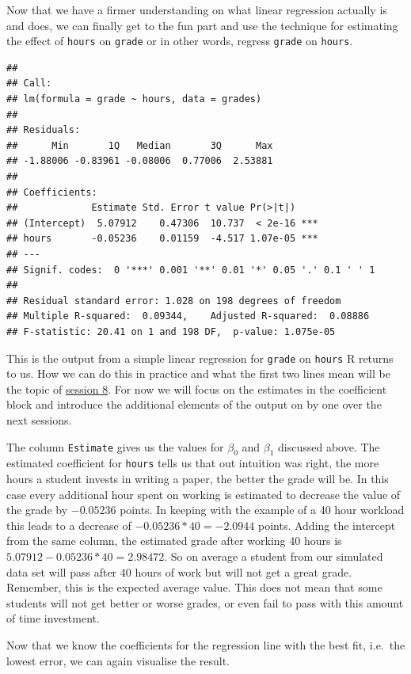 \documentclass[
]{book}
\begin{document}
Now that we have a firmer understanding on what linear regression actually is
and does, we can finally get to the fun part and use the technique for
estimating the effect of \texttt{hours} on \texttt{grade} or in other words, regress
\texttt{grade} on \texttt{hours}.

\begin{verbatim}
## 
## Call:
## lm(formula = grade ~ hours, data = grades)
## 
## Residuals:
##      Min       1Q   Median       3Q      Max 
## -1.88006 -0.83961 -0.08006  0.77006  2.53881 
## 
## Coefficients:
##             Estimate Std. Error t value Pr(>|t|)    
## (Intercept)  5.07912    0.47306  10.737  < 2e-16 ***
## hours       -0.05236    0.01159  -4.517 1.07e-05 ***
## ---
## Signif. codes:  0 '***' 0.001 '**' 0.01 '*' 0.05 '.' 0.1 ' ' 1
## 
## Residual standard error: 1.028 on 198 degrees of freedom
## Multiple R-squared:  0.09344,    Adjusted R-squared:  0.08886 
## F-statistic: 20.41 on 1 and 198 DF,  p-value: 1.075e-05
\end{verbatim}

This is the output from a simple linear regression for \texttt{grade} on \texttt{hours} R
returns to us.
How we can do this in practice and what the first two lines mean will be the
topic of \protect\hyperlink{lin-a}{session 8}. For now we will focus on the estimates in the coefficient
block and introduce the additional elements of the output on by one over the
next sessions.

The column \texttt{Estimate} gives us the values for \(\beta_0\) and \(\beta_1\) discussed
above. The estimated coefficient for \texttt{hours} tells us that out intuition was
right, the more hours a student invests in writing a paper, the better the grade
will be. In this case every additional hour spent on working is estimated to decrease the
value of the grade by \(-0.05236\) points. In keeping with the example of a 40
hour workload this leads to a decrease of \(-0.05236 * 40 = -2.0944\) points.
Adding the intercept from the same column, the estimated grade after working 40
hours is \(5.07912 -0.05236 * 40 = 2.98472\). So on average a student from our
simulated data set will pass after 40 hours of work but will not get a great
grade.
Remember, this is the expected average value. This does not mean that some
students will not get better or worse grades, or even fail to pass with this
amount of time investment.

Now that we know the coefficients for the regression line with the best fit,
i.e.~the lowest error, we can again visualise the result.
\end{document}
